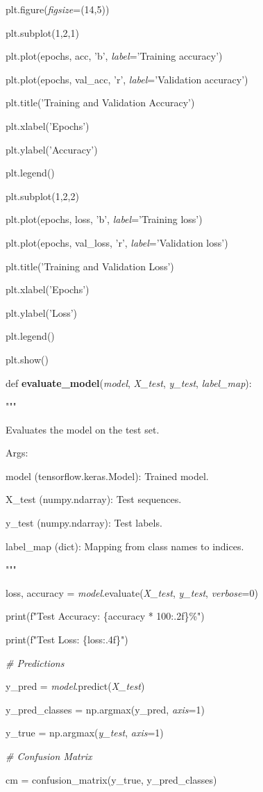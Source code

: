 \documentclass[
]{article}
\begin{document}
plt.figure(\emph{figsize}=(14,5))

plt.subplot(1,2,1)

plt.plot(epochs, acc, 'b', \emph{label}='Training accuracy')

plt.plot(epochs, val\_acc, 'r', \emph{label}='Validation accuracy')

plt.title('Training and Validation Accuracy')

plt.xlabel('Epochs')

plt.ylabel('Accuracy')

plt.legend()

plt.subplot(1,2,2)

plt.plot(epochs, loss, 'b', \emph{label}='Training loss')

plt.plot(epochs, val\_loss, 'r', \emph{label}='Validation loss')

plt.title('Training and Validation Loss')

plt.xlabel('Epochs')

plt.ylabel('Loss')

plt.legend()

plt.show()

def \textbf{evaluate\_model}(\emph{model}, \emph{X\_test}, \emph{y\_test}, \emph{label\_map}):

"""

Evaluates the model on the test set.

Args:

model (tensorflow.keras.Model): Trained model.

X\_test (numpy.ndarray): Test sequences.

y\_test (numpy.ndarray): Test labels.

label\_map (dict): Mapping from class names to indices.

"""

loss, accuracy = \emph{model}.evaluate(\emph{X\_test}, \emph{y\_test}, \emph{verbose}=0)

print(f"Test Accuracy: \{accuracy * 100:.2f\}\%")

print(f"Test Loss: \{loss:.4f\}")

\emph{\# Predictions}

y\_pred = \emph{model}.predict(\emph{X\_test})

y\_pred\_classes = np.argmax(y\_pred, \emph{axis}=1)

y\_true = np.argmax(\emph{y\_test}, \emph{axis}=1)

\emph{\# Confusion Matrix}

cm = confusion\_matrix(y\_true, y\_pred\_classes)
\end{document}

